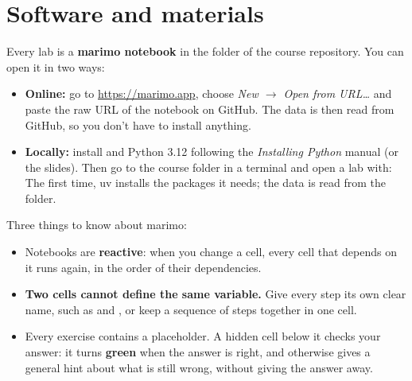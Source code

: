 \section{Software and materials}

Every lab is a \textbf{marimo notebook} in the  folder of the
course repository. You can open it in two ways:

\begin{itemize}
    \item \textbf{Online:} go to \url{https://marimo.app}, choose
        \emph{New $\rightarrow$ Open from URL\dots} and paste the raw URL
        of the notebook on GitHub. The data is then read from GitHub, so
        you don't have to install anything.
    \item \textbf{Locally:} install  and Python 3.12 following
        the \emph{Installing Python} manual (or the slides). Then go to the
        course folder in a terminal and open a lab with:\newline
        \newline The
        first time, uv installs the packages it needs; the data is read
        from the  folder.
\end{itemize}

Three things to know about marimo:

\begin{itemize}
  \item Notebooks are \textbf{reactive}: when you change a cell, every
        cell that depends on it runs again, in the order of their
        dependencies.
  \item \textbf{Two cells cannot define the same variable.} Give every
        step its own clear name, such as  and
        , or keep a sequence of steps together in one
        cell.
  \item Every exercise contains a  placeholder. A hidden cell
        below it checks your answer: it turns \textbf{green} when the
        answer is right, and otherwise gives a general hint about what is
        still wrong, without giving the answer away.
\end{itemize}
